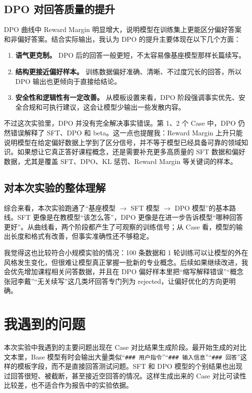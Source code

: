 \documentclass[a4paper,12pt]{ctexart}
\begin{document}
\subsection{DPO 对回答质量的提升}

DPO 曲线中 Reward Margin 明显增大，说明模型在训练集上更能区分偏好答案和非偏好答案。结合实际输出，我认为 DPO 的提升主要体现在以下几个方面：

\begin{enumerate}
    \item \textbf{语气更克制。} DPO 后的回答一般更短，不太容易像基座模型那样长篇续写。
    \item \textbf{结构更接近偏好样本。} 训练数据偏好准确、清晰、不过度冗长的回答，所以 DPO 输出也更倾向于直接给结论。
    \item \textbf{安全性和逻辑性有一定改善。} 从模板设置来看，DPO 阶段强调事实优先、安全合规和可执行建议，这会让模型少输出一些发散内容。
\end{enumerate}

不过这次实验里，DPO 并没有完全解决事实错误。第 1、2 个 Case 中，DPO 仍然错误解释了 SFT、DPO 和 beta。这一点也提醒我：Reward Margin 上升只能说明模型在给定偏好数据上学到了区分信号，并不等于模型已经具备可靠的领域知识。如果想让它真正答好课程概念，还是需要补充更多高质量的 SFT 数据和偏好数据，尤其是覆盖 SFT、DPO、KL 惩罚、Reward Margin 等关键词的样本。

\subsection{对本次实验的整体理解}

综合来看，本次实验跑通了“基座模型 $\rightarrow$ SFT 模型 $\rightarrow$ DPO 模型”的基本路线。SFT 更像是在教模型“该怎么答”，DPO 更像是在进一步告诉模型“哪种回答更好”。从曲线看，两个阶段都产生了可观察的训练信号；从 Case 看，模型的输出长度和格式有改善，但事实准确性还不够稳定。

我觉得这也比较符合小规模实验的情况：100 条数据和 1 轮训练可以让模型的外在风格发生变化，但很难让模型真正掌握一批新的专业概念。后续如果继续改进，我会优先增加课程相关问答数据，并且在 DPO 偏好样本里把“缩写解释错误”“概念张冠李戴”“无关续写”这几类坏回答专门列为 rejected，让偏好优化的方向更明确。

\section{我遇到的问题}

本次实验中我遇到的主要问题出现在 Case 对比结果生成阶段。最开始生成的对比文本里，Base 模型有时会输出大量类似“\texttt{\#\#\# 用户指令}”“\texttt{\#\#\# 输入信息}”“\texttt{\#\#\# 回答}”这样的模板字段，而不是直接回答测试问题。SFT 和 DPO 模型的个别结果也出现过回答很短、被截断，甚至接近空回答的情况。这样生成出来的 Case 对比可读性比较差，也不适合作为报告中的实验依据。
\end{document}
